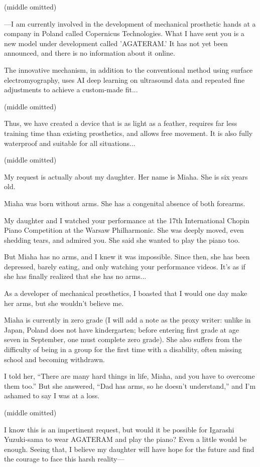 \documentclass[
    a4paper,
    12pt,
    twoside,
    openany,
    UTF8,
    fontset=windows
]{ctexbook}
\begin{document}
(middle omitted)

---I am currently involved in the development of mechanical prosthetic hands at a company in Poland called Copernicus Technologies. What I have sent you is a new model under development called 'AGATERAM.' It has not yet been announced, and there is no information about it online.

The innovative mechanism, in addition to the conventional method using surface electromyography, uses AI deep learning on ultrasound data and repeated fine adjustments to achieve a custom-made fit...

(middle omitted)

Thus, we have created a device that is as light as a feather, requires far less training time than existing prosthetics, and allows free movement. It is also fully waterproof and suitable for all situations...

(middle omitted)

My request is actually about my daughter. Her name is Miaha. She is six years old.

Miaha was born without arms. She has a congenital absence of both forearms.

My daughter and I watched your performance at the 17th International Chopin Piano Competition at the Warsaw Philharmonic. She was deeply moved, even shedding tears, and admired you. She said she wanted to play the piano too.

But Miaha has no arms, and I knew it was impossible. Since then, she has been depressed, barely eating, and only watching your performance videos. It's as if she has finally realized that she has no arms...

As a developer of mechanical prosthetics, I boasted that I would one day make her arms, but she wouldn't believe me.

Miaha is currently in zero grade (I will add a note as the proxy writer: unlike in Japan, Poland does not have kindergarten; before entering first grade at age seven in September, one must complete zero grade). She also suffers from the difficulty of being in a group for the first time with a disability, often missing school and becoming withdrawn.

I told her, ``There are many hard things in life, Miaha, and you have to overcome them too.'' But she answered, ``Dad has arms, so he doesn't understand,'' and I'm ashamed to say I was at a loss.

(middle omitted)

I know this is an impertinent request, but would it be possible for Igarashi Yuzuki-sama to wear AGATERAM and play the piano? Even a little would be enough. Seeing that, I believe my daughter will have hope for the future and find the courage to face this harsh reality---
\end{document}
